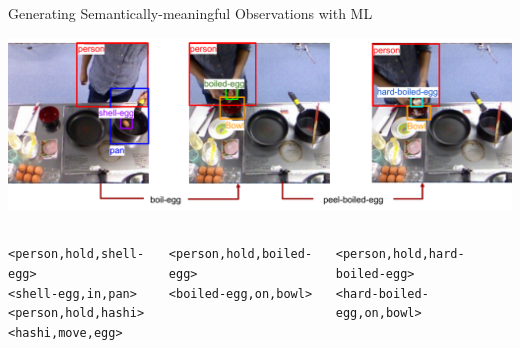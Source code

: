 \documentclass[usenames,dvipsnames]{beamer}
\begin{document}
\begin{frame}[c]{Generating Semantically-meaningful Observations with ML}
	\begin{center}
		\includegraphics[width=\textwidth]{fig/computer-vision-transition-boiled-egg.pdf}
	\end{center}
	\begin{columns}
		\begin{column}{.3\linewidth}
			\tiny
			\texttt{<{\color{red}person},{\color{black}hold},{\color{purple}shell-egg}>}\\
			\texttt{<{\color{Magenta}shell-egg},{\color{black}in},{\color{blue}pan}>}\\
			\texttt{<{\color{red}person},{\color{black}hold},{\color{black}hashi}>}\\
			\texttt{<{\color{black}hashi},{\color{black}move},{\color{black}egg}>}
		\end{column}
		\begin{column}{.3\linewidth}
			\tiny
			\texttt{<{\color{red}person},{\color{black}hold},{\color{OliveGreen}boiled-egg}>}\\
			\texttt{<{\color{OliveGreen}boiled-egg},{\color{black}on},{\color{orange}bowl}>}
		\end{column}
		\begin{column}{.3\linewidth}
			\tiny
			\texttt{<{\color{red}person},{\color{black}hold},{\color{blue}hard-boiled-egg}>}\\
			\texttt{<{\color{OliveGreen}hard-boiled-egg},{\color{black}on},{\color{orange}bowl}>}
		\end{column}
	\end{columns}
\end{frame}
\end{document}
